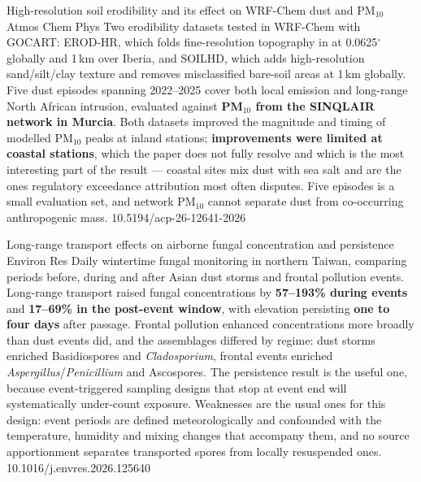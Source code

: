 \documentclass[10pt]{article}
\begin{document}
{High-resolution soil erodibility and its effect on WRF-Chem dust and PM$_{10}$}
{Atmos Chem Phys}
{Two erodibility datasets tested in WRF-Chem with GOCART: EROD-HR, which folds fine-resolution
topography in at 0.0625$^\circ$ globally and 1\,km over Iberia, and SOILHD, which adds
high-resolution sand/silt/clay texture and removes misclassified bare-soil areas at 1\,km
globally. Five dust episodes spanning 2022--2025 cover both local emission and long-range
North African intrusion, evaluated against \textbf{PM$_{10}$ from the SINQLAIR network in
Murcia}. Both datasets improved the magnitude and timing of modelled PM$_{10}$ peaks at
inland stations; \textbf{improvements were limited at coastal stations}, which the paper does
not fully resolve and which is the most interesting part of the result --- coastal sites mix
dust with sea salt and are the ones regulatory exceedance attribution most often disputes.
Five episodes is a small evaluation set, and network PM$_{10}$ cannot separate dust from
co-occurring anthropogenic mass.}
{10.5194/acp-26-12641-2026}

{Long-range transport effects on airborne fungal concentration and persistence}
{Environ Res}
{Daily wintertime fungal monitoring in northern Taiwan, comparing periods before, during and
after Asian dust storms and frontal pollution events. Long-range transport raised fungal
concentrations by \textbf{57--193\% during events} and \textbf{17--69\% in the post-event
window}, with elevation persisting \textbf{one to four days} after passage. Frontal pollution
enhanced concentrations more broadly than dust events did, and the assemblages differed by
regime: dust storms enriched Basidiospores and \textit{Cladosporium}, frontal events enriched
\textit{Aspergillus}/\textit{Penicillium} and Ascospores. The persistence result is the useful
one, because event-triggered sampling designs that stop at event end will systematically
under-count exposure. Weaknesses are the usual ones for this design: event periods are
defined meteorologically and confounded with the temperature, humidity and mixing changes
that accompany them, and no source apportionment separates transported spores from locally
resuspended ones.}
{10.1016/j.envres.2026.125640}
\end{document}
